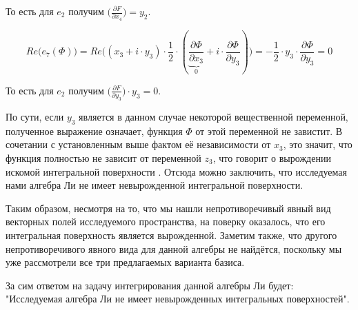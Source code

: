 \documentclass[a4paper]{article}
\begin{document}
То есть для $e_{2}$ получим $\Big(\frac{\partial F}{\partial x_{4}}\Big) = y_{2}$.

\begin{equation*}
    Re\Big(e_{7}(\Phi)\Big) = Re\Big( (x_{3}+i\cdot y_{3}) \cdot \frac{1}{2} \cdot ( \underbrace{\frac{\partial \Phi}{\partial x_{3}}}_{0} + i \cdot \frac{\partial \Phi}{\partial y_{3}}) \Big)
     = - \frac{1}{2} \cdot y_{3} \cdot \frac{\partial \Phi}{\partial y_{3}} = 0
\end{equation*}

То есть для $e_{2}$ получим $\Big(\frac{\partial F}{\partial y_{3}}\Big) \cdot y_{3} = 0$.

По сути, если $y_{3}$ является в данном случае некоторой вещественной переменной, полученное выражение означает, функция $\Phi$ от этой переменной не завистит. В сочетании с установленным выше фактом её независимости от $x_{3}$, это значит, что функция полностью не зависит от переменной $z_{3}$, что говорит о вырождении искомой интегральной поверхности \cite{Loboda}. Отсюда можно заключить, что исследуемая нами алгебра Ли не имеет невырожденной интегральной поверхности.

Таким образом, несмотря на то, что мы нашли непротиворечивый явный вид векторных полей исследуемого пространства, на поверку оказалось, что его интегральная поверхность является вырожденной. Заметим также, что другого непротиворечивого явного вида для данной алгебры не найдётся, поскольку мы уже рассмотрели все три предлагаемых варианта базиса.

За сим ответом на задачу интегрирования данной алгебры Ли будет: "Исследуемая алгебра Ли не имеет невырожденных интегральных поверхностей".
\newpage
{}

\end{document}
